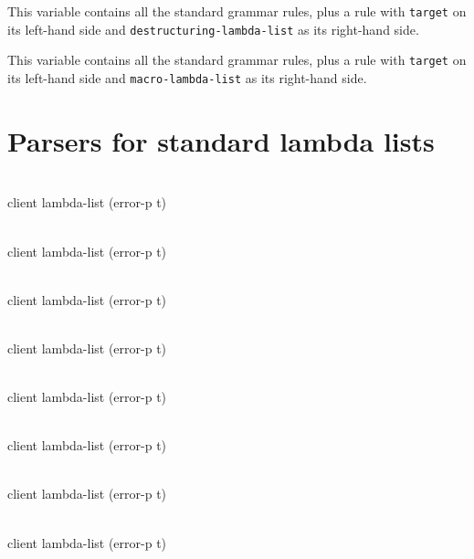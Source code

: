 
This variable contains all the standard grammar rules, plus a rule
with \texttt{target} on its left-hand side and
\texttt{destructuring-lambda-list} as its right-hand side.


This variable contains all the standard grammar rules, plus a rule
with \texttt{target} on its left-hand side and
\texttt{macro-lambda-list} as its right-hand side.

\section{Parsers for standard lambda lists}

\\
{client lambda-list \key (error-p t)}

\\
{client lambda-list \key (error-p t)}

\\
{client lambda-list \key (error-p t)}

\\
{client lambda-list \key (error-p t)}

\\
{client lambda-list \key (error-p t)}

\\
{client lambda-list \key (error-p t)}

\\
{client lambda-list \key (error-p t)}

\\
{client lambda-list \key (error-p t)}
